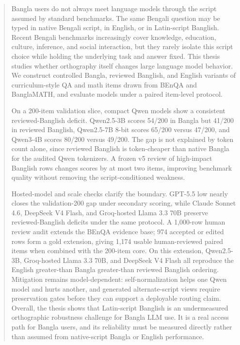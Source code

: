 
\renewcommand{\abstractname}{\textbf{{\Large ABSTRACT}}}

\begin{abstract}\thispagestyle{plain}
Bangla users do not always meet language models through the script assumed by
standard benchmarks. The same Bengali question may be typed in native Bengali
script, in English, or in Latin-script Banglish. Recent Bengali benchmarks
increasingly cover knowledge, education, culture, inference, and social
interaction, but they rarely isolate this script choice while holding the
underlying task and answer fixed. This thesis studies whether orthography
itself changes large language model behavior. We construct controlled Bangla,
reviewed Banglish, and English variants of curriculum-style QA and math items
drawn from BEnQA and BanglaMATH, and evaluate models under a paired item-level
protocol.

On a 200-item validation slice, compact Qwen models show a consistent
reviewed-Banglish deficit. Qwen2.5-3B scores 54/200 in Bangla but 41/200 in
reviewed Banglish, Qwen2.5-7B 8-bit scores 65/200 versus 47/200, and Qwen3-4B
scores 80/200 versus 49/200. The gap is not explained by token count alone,
since reviewed Banglish is token-cheaper than native Bangla for the audited
Qwen tokenizers. A frozen v5 review of high-impact Banglish rows changes scores
by at most two items, improving benchmark quality without removing the
script-conditioned weakness.

Hosted-model and scale checks clarify the boundary. GPT-5.5 low nearly closes
the validation-200 gap under secondary scoring, while Claude Sonnet 4.6,
DeepSeek V4 Flash, and Groq-hosted Llama 3.3 70B preserve reviewed-Banglish
deficits under the same protocol. A 1,000-row human review audit extends the
BEnQA evidence base; 974 accepted or edited rows form a gold extension, giving
1,174 usable human-reviewed paired items when combined with the 200-item core.
On this extension, Qwen2.5-3B, Groq-hosted Llama 3.3 70B, and DeepSeek V4 Flash
all reproduce the English greater-than Bangla greater-than reviewed Banglish
ordering. Mitigation remains model-dependent: self-normalization helps one
Qwen model and hurts another, and generated alternate-script views require
preservation gates before they can support a deployable routing claim. Overall,
the thesis shows that Latin-script Banglish is an undermeasured orthographic
robustness challenge for Bangla LLM use. It is a real access path for Bangla
users, and its reliability must be measured directly rather than assumed from
native-script Bangla or English performance.
\end{abstract}

\endinput
